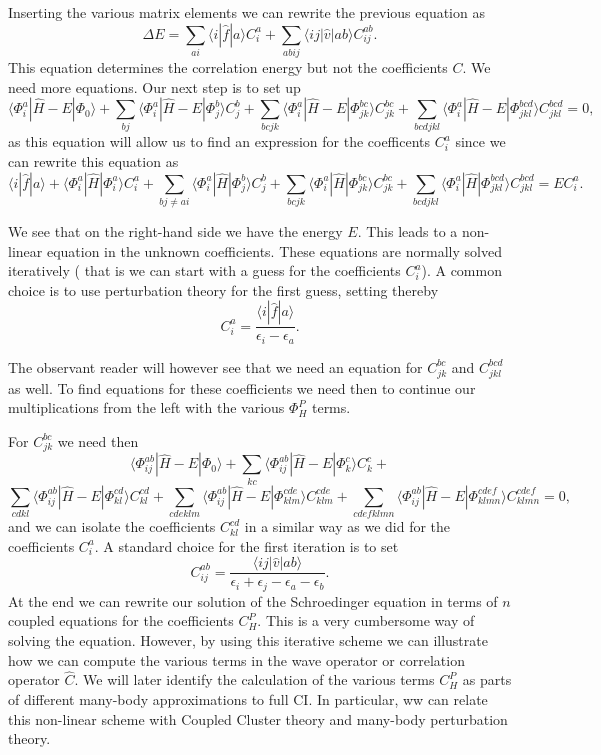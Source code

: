 \documentclass[%
twoside,                 %
final,                   %
10pt]{article}
\begin{document}
Inserting the various matrix elements we can rewrite the previous equation as
\[
\Delta E=\sum_{ai}\langle i| \hat{f}|a \rangle C_{i}^{a}+
\sum_{abij}\langle ij | \hat{v}| ab \rangle C_{ij}^{ab}.
\]
This equation determines the correlation energy but not the coefficients $C$. 
We need more equations. Our next step is to set up
\[
\langle \Phi_i^a | \hat{H} -E| \Phi_0\rangle + \sum_{bj}\langle \Phi_i^a | \hat{H} -E|\Phi_{j}^{b} \rangle C_{j}^{b}+
\sum_{bcjk}\langle \Phi_i^a | \hat{H} -E|\Phi_{jk}^{bc} \rangle C_{jk}^{bc}+
\sum_{bcdjkl}\langle \Phi_i^a | \hat{H} -E|\Phi_{jkl}^{bcd} \rangle C_{jkl}^{bcd}=0,
\]
as this equation will allow us to find an expression for the coefficents $C_i^a$ since we can rewrite this equation as 
\[
\langle i | \hat{f}| a\rangle +\langle \Phi_i^a | \hat{H}|\Phi_{i}^{a} \rangle C_{i}^{a}+ \sum_{bj\ne ai}\langle \Phi_i^a | \hat{H}|\Phi_{j}^{b} \rangle C_{j}^{b}+
\sum_{bcjk}\langle \Phi_i^a | \hat{H}|\Phi_{jk}^{bc} \rangle C_{jk}^{bc}+
\sum_{bcdjkl}\langle \Phi_i^a | \hat{H}|\Phi_{jkl}^{bcd} \rangle C_{jkl}^{bcd}=EC_i^a.
\]

We see that on the right-hand side we have the energy $E$. This leads to a non-linear equation in the unknown coefficients. 
These equations are normally solved iteratively ( that is we can start with a guess for the coefficients $C_i^a$). A common choice is to use perturbation theory for the first guess, setting thereby
\[
 C_{i}^{a}=\frac{\langle i | \hat{f}| a\rangle}{\epsilon_i-\epsilon_a}.
\]

The observant reader will however see that we need an equation for $C_{jk}^{bc}$ and $C_{jkl}^{bcd}$ as well.
To find equations for these coefficients we need then to continue our multiplications from the left with the various
$\Phi_{H}^P$ terms. 


For $C_{jk}^{bc}$ we need then
\[
\langle \Phi_{ij}^{ab} | \hat{H} -E| \Phi_0\rangle + \sum_{kc}\langle \Phi_{ij}^{ab} | \hat{H} -E|\Phi_{k}^{c} \rangle C_{k}^{c}+
\]
\[
\sum_{cdkl}\langle \Phi_{ij}^{ab} | \hat{H} -E|\Phi_{kl}^{cd} \rangle C_{kl}^{cd}+\sum_{cdeklm}\langle \Phi_{ij}^{ab} | \hat{H} -E|\Phi_{klm}^{cde} \rangle C_{klm}^{cde}+\sum_{cdefklmn}\langle \Phi_{ij}^{ab} | \hat{H} -E|\Phi_{klmn}^{cdef} \rangle C_{klmn}^{cdef}=0,
\]
and we can isolate the coefficients $C_{kl}^{cd}$ in a similar way as we did for the coefficients $C_{i}^{a}$. 
A standard choice for the first iteration is to set 
\[
C_{ij}^{ab} =\frac{\langle ij \vert \hat{v} \vert ab \rangle}{\epsilon_i+\epsilon_j-\epsilon_a-\epsilon_b}.
\]
At the end we can rewrite our solution of the Schroedinger equation in terms of $n$ coupled equations for the coefficients $C_H^P$.
This is a very cumbersome way of solving the equation. However, by using this iterative scheme we can illustrate how we can compute the
various terms in the wave operator or correlation operator $\hat{C}$. We will later identify the calculation of the various terms $C_H^P$
as parts of different many-body approximations to full CI. In particular, ww can  relate this non-linear scheme with Coupled Cluster theory and
many-body perturbation theory.



\printindex
\end{document}
